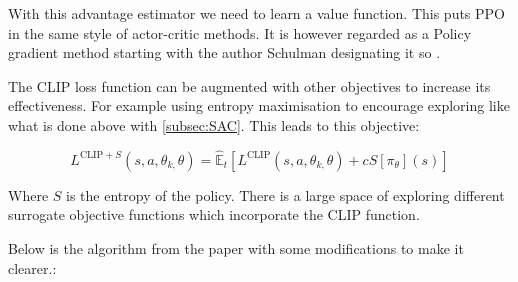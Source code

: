 With this advantage estimator we need to learn a value function. This puts PPO in the same style of actor-critic methods. It is however regarded as a Policy gradient method starting with the author Schulman designating it so \cite{schulmanProximalPolicyOptimization2017}.

The CLIP loss function can be augmented with other objectives to increase its effectiveness. For example using entropy maximisation to encourage exploring like what is done above with \ref{subsec:SAC}. This leads to this objective:

\begin{equation}
L^{\text{CLIP} + S}(s, a, \theta_{k, }\theta)=\hat{\mathbb{E}}_{t}\left[ L^{\text{CLIP}}(s,a, \theta_{k, }\theta)+cS\left[ \pi_{\theta}\right](s)  \right] 
\end{equation}

Where $S$ is the entropy of the policy. There is a large space of exploring different surrogate objective functions which incorporate the CLIP function.

Below is the algorithm from the paper \cite{schulmanProximalPolicyOptimization2017} with some modifications to make it clearer.:

